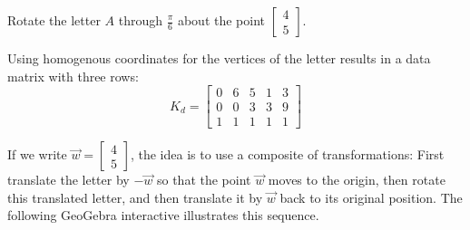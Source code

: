 \documentclass{ximera}
\begin{document}
    
\begin{example}\label{exa:013322}
Rotate the letter $A$ through $\frac{\pi}{6}$ about the point $\left[
\begin{array}{c}
4\\
5
\end{array}
\right]$.
    
\begin{center}
\end{center}
    
\begin{explanation}
Using homogenous coordinates for the vertices of the letter results in a data matrix with three rows:
\begin{equation*}
K_{d} =  \left[
\begin{array}{rrrrr}
0 & 6 & 5 & 1 & 3\\
0 & 0 & 3 & 3 & 9 \\
1 & 1 & 1 & 1 & 1
\end{array}
\right]
\end{equation*}
    
%
    
    
If we write $\vec{w} = \left[
\begin{array}{c}
4\\
5
\end{array}
\right]$, the idea is to use a composite of transformations: First translate the letter by $-\vec{w}$ so that the point $\vec{w}$ moves to the origin, then rotate this translated letter, and then translate it by $\vec{w}$ back to its original position. The following GeoGebra interactive illustrates this sequence.
    

\end{explanation}
\end{example}
\end{document}
